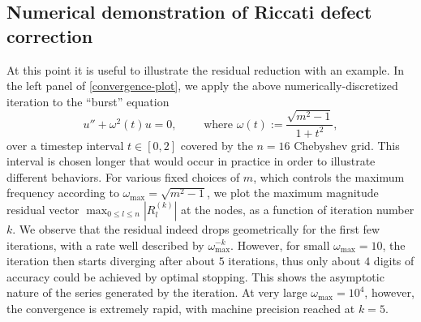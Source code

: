 \documentclass[10pt]{article}
\newcommand{\om}{\omega}
\begin{document}


\subsection{Numerical demonstration of Riccati defect correction}
\label{s:demo}

At this point it is useful to illustrate the residual reduction
with an example.
In the left panel of \cref{convergence-plot}, we apply
the above numerically-discretized iteration to the ``burst'' equation
\begin{equation}\label{bursteq}
  u'' + \om^2(t) u = 0, \qquad \mbox{ where } \om(t):=\frac{\sqrt{m^2 - 1}}{1+t^2},
\end{equation}
over a timestep interval $t \in [0, 2]$ covered by the $n=16$ Chebyshev grid.
This interval is chosen longer that would occur in practice in order
to illustrate different behaviors.
%
For various fixed choices of $m$, which controls
the maximum frequency according to $\om_{\text{max}} = \sqrt{m^2-1}$,
we plot the maximum magnitude residual vector $\max_{0\le l \le n} |R_l^{(k)}|$
at the nodes, as a function of iteration number $k$.
%
We observe that the residual
indeed drops geometrically for the first few iterations,
with a rate well described by $\om_{\text{max}}^{-k}$.
However, for small $\om_{\text{max}}=10$, the iteration
then starts diverging after about $5$
iterations, thus only about $4$ digits of accuracy could be achieved
by optimal stopping.
This shows the asymptotic nature of the series generated by the iteration.
At very large $\om_{\text{max}} = 10^4$, however, the
convergence is extremely rapid, with machine precision reached at $k=5$.
\end{document}
